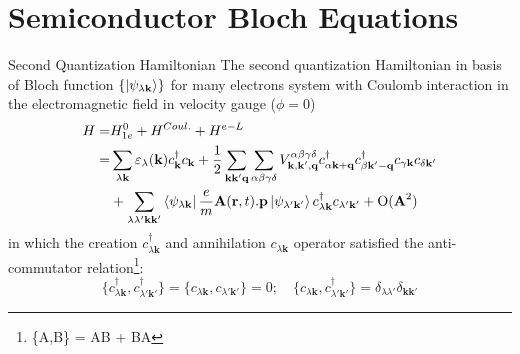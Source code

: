 \documentclass{beamer}
\begin{document}
\section{Semiconductor Bloch Equations}
\begin{frame}{Second Quantization Hamiltonian}
\quad The second quantization Hamiltonian in basis of Bloch function $\{\ket{\psi_{\lambda \textbf{k}}}\}$ for many electrons system with Coulomb interaction in the electromagnetic field in velocity gauge (\(\phi =0\))
\begin{align}
	\label{2nd H}
H =& H_{1e}^0 + H^{Coul.} + H^{e-L}\nonumber\\=& \sum_{\lambda \textbf{k}} \varepsilon_{\lambda}(\textbf{k}) c^\dagger_{\textbf{k}} c_{\textbf{k}} +\frac{1}{2} \sum_{\textbf{k}\textbf{k}'\textbf{q}}\sum_{\alpha \beta \gamma \delta} V^{\alpha\beta\gamma\delta}_{\textbf{k},\textbf{k}',\textbf{q}}c^\dagger_{\alpha\textbf{k}+\textbf{q}} c^\dagger_{\beta\textbf{k}'-\textbf{q}} c_{\gamma\textbf{k}} c_{\delta \textbf{k}'}\\
&+ \sum_{\lambda \lambda' \textbf{k}\textbf{k}'} \bra{\psi_{\lambda \textbf{k}}}\frac{e}{m}\textbf{A}(\textbf{r},t).\textbf{p}\ket{\psi_{\lambda' \textbf{k}'}}c^{\dagger}_{\lambda \textbf{k}} c_{\lambda' \textbf{k}'}\nonumber + \mathrm{O}(\textbf{A}^2)
\end{align}
\quad in which the creation \(c^\dagger_{\lambda\textbf{k}}\) and annihilation \(c_{\lambda\textbf{k}}\) operator satisfied the anti-commutator relation\footnote{\{A,B\} = AB + BA}:
$$\{c^\dagger_{\lambda \textbf{k}},c^\dagger_{\lambda'\textbf{k}'}\} = \{c_{\lambda \textbf{k}},c_{\lambda'\textbf{k}'}\} = 0;\quad \{c_{\lambda \textbf{k}},c^\dagger_{\lambda'\textbf{k}'}\} = \delta_{\lambda\lambda'} \delta_{\textbf{k}\textbf{k}'}$$
\end{frame}
\end{document}

